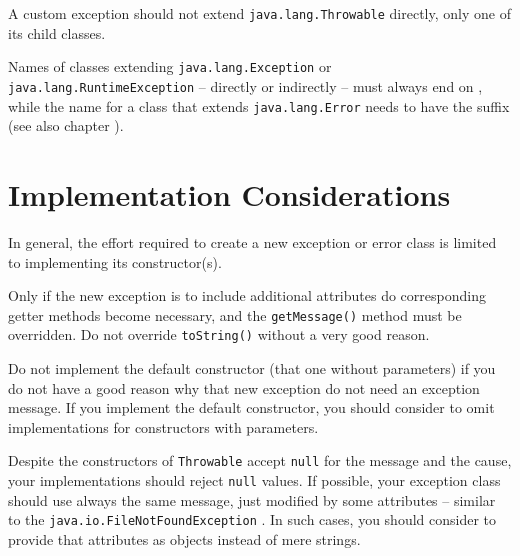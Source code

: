 A custom exception should not extend \lstinline|java.lang.Throwable| directly, only one of its child classes.

Names of classes extending \lstinline|java.lang.Exception| or \lstinline|java.lang.RuntimeException| – directly or indirectly – must always end on , while the name for a class that extends \lstinline|java.lang.Error| needs to have the suffix  (see also chapter ).







\section{Implementation Considerations}
In general, the effort required to create a new exception or error class is limited to implementing its constructor(s).

Only if the new exception is to include additional attributes do corresponding getter methods become necessary, and the
\lstinline|getMessage()| method must be overridden. Do not override \lstinline|toString()| without a very good reason.

Do not implement the default constructor (that one without parameters) if you do not have a good reason why that new exception do not need an exception message. If you implement the default constructor, you should consider to omit implementations for constructors with parameters.

Despite the constructors of \lstinline|Throwable| accept \lstinline|null| for the message and the cause, your implementations should reject \lstinline|null| values. If possible, your exception class should use always the same message, just modified by some attributes – similar to the \lstinline|java.io.FileNotFoundException| \autocite{ORACLE_DOC_FILENOTFOUNDEXCEPTION_CLASS}. In such cases, you should consider to provide that attributes as objects instead of mere strings.

